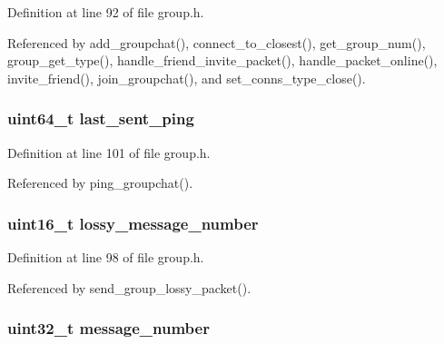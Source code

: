 Definition at line 92 of file group.\+h.



Referenced by add\+\_\+groupchat(), connect\+\_\+to\+\_\+closest(), get\+\_\+group\+\_\+num(), group\+\_\+get\+\_\+type(), handle\+\_\+friend\+\_\+invite\+\_\+packet(), handle\+\_\+packet\+\_\+online(), invite\+\_\+friend(), join\+\_\+groupchat(), and set\+\_\+conns\+\_\+type\+\_\+close().

\hypertarget{struct_group__c_a0137c615a93acf73b05a3d710231dd3d}{
\subsubsection[{last\+\_\+sent\+\_\+ping}]{\setlength{\rightskip}{0pt plus 5cm}uint64\+\_\+t last\+\_\+sent\+\_\+ping}}\label{struct_group__c_a0137c615a93acf73b05a3d710231dd3d}


Definition at line 101 of file group.\+h.



Referenced by ping\+\_\+groupchat().

\hypertarget{struct_group__c_acc475ae1ff50d43f08a2cc920a5d2ae5}{
\subsubsection[{lossy\+\_\+message\+\_\+number}]{\setlength{\rightskip}{0pt plus 5cm}uint16\+\_\+t lossy\+\_\+message\+\_\+number}}\label{struct_group__c_acc475ae1ff50d43f08a2cc920a5d2ae5}


Definition at line 98 of file group.\+h.



Referenced by send\+\_\+group\+\_\+lossy\+\_\+packet().

\hypertarget{struct_group__c_a1ecee33a5d6309a114891c3fb740b66c}{
\subsubsection[{message\+\_\+number}]{\setlength{\rightskip}{0pt plus 5cm}uint32\+\_\+t message\+\_\+number}}\label{struct_group__c_a1ecee33a5d6309a114891c3fb740b66c}


